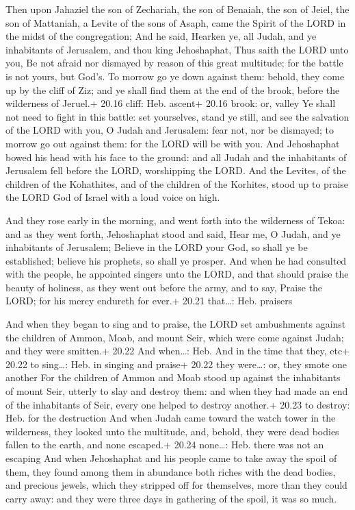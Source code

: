  Then upon Jahaziel the son of Zechariah, the son of
Benaiah, the son of Jeiel, the son of Mattaniah, a Levite of the sons of
Asaph, came the Spirit of the LORD in the midst of the congregation;
 And he said, Hearken ye, all Judah, and ye inhabitants of
Jerusalem, and thou king Jehoshaphat, Thus saith the LORD unto you, Be
not afraid nor dismayed by reason of this great multitude; for the
battle is not yours, but God's.  To morrow go ye down
against them: behold, they come up by the cliff of Ziz; and ye shall
find them at the end of the brook, before the wilderness of Jeruel.+
20.16 cliff: Heb. ascent+ 20.16 brook: or, valley  Ye shall
not need to fight in this battle: set yourselves, stand ye still, and
see the salvation of the LORD with you, O Judah and Jerusalem: fear not,
nor be dismayed; to morrow go out against them: for the LORD will be
with you.  And Jehoshaphat bowed his head with his face to
the ground: and all Judah and the inhabitants of Jerusalem fell before
the LORD, worshipping the LORD.  And the Levites, of the
children of the Kohathites, and of the children of the Korhites, stood
up to praise the LORD God of Israel with a loud voice on high.

 And they rose early in the morning, and went forth into
the wilderness of Tekoa: and as they went forth, Jehoshaphat stood and
said, Hear me, O Judah, and ye inhabitants of Jerusalem; Believe in the
LORD your God, so shall ye be established; believe his prophets, so
shall ye prosper.  And when he had consulted with the
people, he appointed singers unto the LORD, and that should praise the
beauty of holiness, as they went out before the army, and to say, Praise
the LORD; for his mercy endureth for ever.+ 20.21 that\ldots: Heb.
praisers

 And when they began to sing and to praise, the LORD set
ambushments against the children of Ammon, Moab, and mount Seir, which
were come against Judah; and they were smitten.+ 20.22 And when\ldots:
Heb. And in the time that they, etc+ 20.22 to sing\ldots: Heb. in
singing and praise+ 20.22 they were\ldots: or, they smote one another
 For the children of Ammon and Moab stood up against the
inhabitants of mount Seir, utterly to slay and destroy them: and when
they had made an end of the inhabitants of Seir, every one helped to
destroy another.+ 20.23 to destroy: Heb. for the destruction
 And when Judah came toward the watch tower in the
wilderness, they looked unto the multitude, and, behold, they were dead
bodies fallen to the earth, and none escaped.+ 20.24 none\ldots: Heb.
there was not an escaping  And when Jehoshaphat and his
people came to take away the spoil of them, they found among them in
abundance both riches with the dead bodies, and precious jewels, which
they stripped off for themselves, more than they could carry away: and
they were three days in gathering of the spoil, it was so much.

